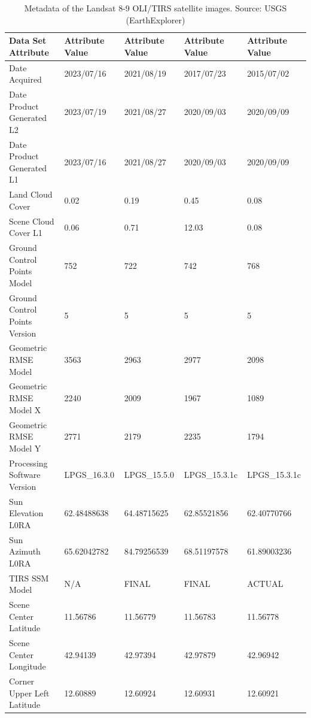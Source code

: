 \documentclass[jimaging,article,submit,pdftex,moreauthors]{Definitions/mdpi}
\begin{document}
\begin{table}[!ht]
\caption{{Metadata} of the Landsat 8-9 OLI/TIRS satellite images{. }Source: USGS (EarthExplorer)}
\label{tab02}
    \centering
\footnotesize 
    \begin{tabular}{ l | l | l | l | l }
    \hline
        Data Set Attribute & \textbf{Attribute Value} & \textbf{Attribute Value} & \textbf{Attribute Value} & \textbf{Attribute Value} \\ \toprule
        Date Acquired & 2023/07/16 & 2021/08/19 & 2017/07/23 & 2015/07/02 \\ \hline
        Date Product Generated L2 & 2023/07/19 & 2021/08/27 & 2020/09/03 & 2020/09/09 \\ \hline
        Date Product Generated L1 & 2023/07/16 & 2021/08/27 & 2020/09/03 & 2020/09/09 \\ \hline
        Land Cloud Cover & 0.02 & 0.19 & 0.45 & 0.08 \\ \hline
        Scene Cloud Cover L1 & 0.06 & 0.71 & 12.03 & 0.08 \\ \hline
        Ground Control Points Model & 752 & 722 & 742 & 768 \\ \hline
        Ground Control Points Version & 5 & 5 & 5 & 5 \\ \hline
        Geometric RMSE Model & 3563 & 2963 & 2977 & 2098 \\ \hline
        Geometric RMSE Model X & 2240 & 2009 & 1967 & 1089 \\ \hline
        Geometric RMSE Model Y & 2771 & 2179 & 2235 & 1794 \\ \hline
        Processing Software Version & LPGS\_16.3.0 & LPGS\_15.5.0 & LPGS\_15.3.1c & LPGS\_15.3.1c \\ \hline
        Sun Elevation L0RA & 62.48488638 & 64.48715625 & 62.85521856 & 62.40770766 \\ \hline
        Sun Azimuth L0RA & 65.62042782 & 84.79256539 & 68.51197578 & 61.89003236 \\ \hline
        TIRS SSM Model & N/A & FINAL & FINAL & ACTUAL \\ \hline
        Scene Center Latitude & 11.56786 & 11.56779 & 11.56783 & 11.56778 \\ \hline
        Scene Center Longitude & 42.94139 & 42.97394 & 42.97879 & 42.96942 \\ \hline
        Corner Upper Left Latitude & 12.60889 & 12.60924 & 12.60931 & 12.60921 \\ \hline

\end{tabular}
\end{table}
\end{document}
